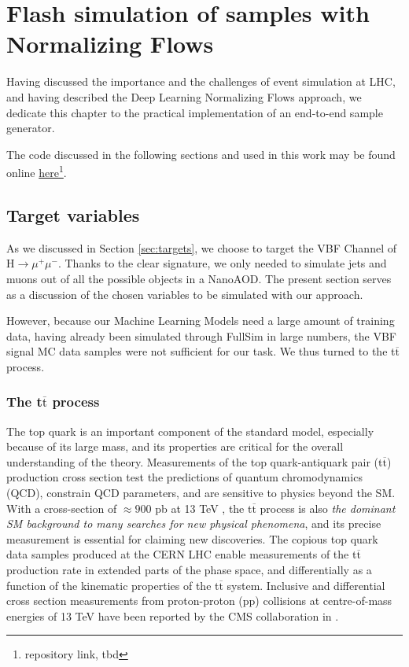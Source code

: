 \chapter{Flash simulation of samples with Normalizing Flows}\label{ch:fs} %

Having discussed the importance and the challenges of event simulation at LHC, and having described the Deep Learning Normalizing Flows approach, we dedicate this chapter to the practical implementation of an end-to-end sample generator.

The code discussed in the following sections and used in this work may be found online \href{tbd}{here}\footnote{repository link, tbd}.

\section{Target variables}

As we discussed in Section \ref{sec:targets}, we choose to target the VBF Channel of H$\rightarrow\mu^+\mu^-$. Thanks to the clear signature, we only needed to simulate jets and muons out of all the possible objects in a NanoAOD. The present section serves as a discussion of the chosen variables to be simulated with our approach.

However, because our Machine Learning Models need a large amount of training data, having already been simulated through FullSim in large numbers, the VBF signal MC data samples were not sufficient for our task. We thus turned to the t$\overline{\text{t}}$ process.

\subsection{The t$\overline{\text{t}}$ process}
The top quark is an important component of the standard model, especially because of
its large mass, and its properties are critical for the overall understanding of the theory. Measurements of the top quark-antiquark pair (t$\overline{\text{t}}$) production cross section test the predictions of
quantum chromodynamics (QCD), constrain QCD parameters, and are sensitive to physics beyond the SM. With a cross-section of $\approx 900$ pb at 13 TeV , the t$\overline{\text{t}}$ process is also \emph{the dominant SM background to many searches for new
physical phenomena}, and its precise measurement is essential for claiming new discoveries.
The copious top quark data samples produced at the CERN LHC enable measurements of the t$\overline{\text{t}}$
production rate in extended parts of the phase space, and differentially as a function of the kinematic properties of the t$\overline{\text{t}}$ system. Inclusive and differential cross section measurements from
proton-proton (pp) collisions at centre-of-mass energies of 13 TeV have been reported by
the CMS collaboration in \cite{Sirunyan_2017}.

